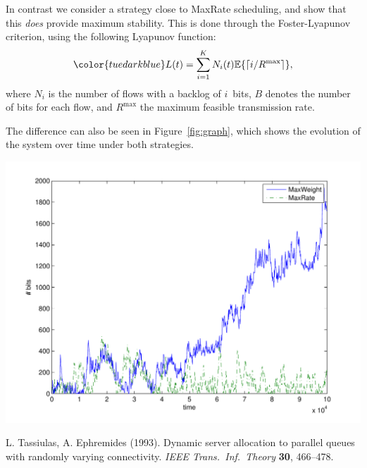 \documentclass[a4paper,11pt]{article}
\begin{document}
\begin{slidetop}
\begin{multicols}{2}
In contrast we consider a strategy close to MaxRate scheduling, and show that this {\em does} provide maximum stability. This is done through the Foster-Lyapunov criterion, using the following Lyapunov function:
\[
\color{tuedarkblue}
L(t) = \sum_{i = 1}^K  N_i(t) {\mathbb E}\{\lceil i/R^{\max} \rceil\},
\]
where $N_i$ is the number of flows with a backlog of $i$~bits, $B$ denotes the number of bits for each flow, and $R^{\max}$ the maximum feasible transmission rate.

The difference can also be seen in Figure~\ref{fig:graph}, which shows the evolution of the system over time under both strategies.

\begin{center}
\includegraphics[width=\linewidth]{graph_unstable2}
\end{center}

\begin{thebibliography}{99}
L. Tassiulas, A. Ephremides (1993).
Dynamic server allocation to parallel queues with randomly varying
connectivity.
{\it IEEE Trans.\ Inf.\ Theory} {\bf 30},
466--478.
\end{thebibliography}
\end{multicols}
\end{slidetop}
\end{document}
